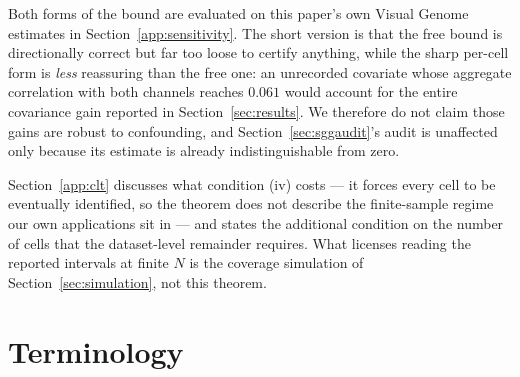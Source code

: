 Both forms of the bound are evaluated on this paper's own Visual Genome estimates in
Section~\ref{app:sensitivity}. The short version is that the free bound is directionally
correct but far too loose to certify anything, while the sharp per-cell form is
\emph{less} reassuring than the free one: an unrecorded covariate whose aggregate
correlation with both channels reaches $0.061$ would account for the entire covariance gain
reported in Section~\ref{sec:results}. We therefore do not claim those gains are robust to
confounding, and Section~\ref{sec:sggaudit}'s audit is unaffected only because its estimate
is already indistinguishable from zero.


Section~\ref{app:clt} discusses what condition (iv) costs --- it forces every cell to be
eventually identified, so the theorem does not describe the finite-sample regime our own
applications sit in --- and states the additional condition on the number of cells that the
dataset-level remainder requires. What licenses reading the reported intervals at finite $N$
is the coverage simulation of Section~\ref{sec:simulation}, not this theorem.

\section{Terminology}\label{app:terms}

